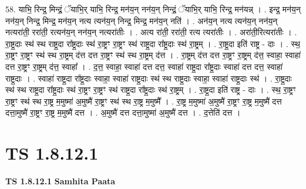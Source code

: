 \documentclass[17pt]{extarticle}
\begin{document}
58. याभि॒ रिन्द्र॒ मिन्द्रं॒ ॅयाभि॒र् याभि॒ रिन्द्र॒ मन॑य॒न् नन॑य॒न् निन्द्रं॒ ॅयाभि॒र् याभि॒ रिन्द्र॒ मन॑यन्न् । . इन्द्र॒ मन॑य॒न् नन॑य॒न् निन्द्र॒ मिन्द्र॒ मन॑य॒न् नत्य त्यन॑य॒न् निन्द्र॒ मिन्द्र॒ मन॑य॒न् नति॑ । . अन॑य॒न् नत्य त्यन॑य॒न् नन॑य॒न् नत्यरा॑ती॒ ररा॑ती॒ रत्यन॑य॒न् नन॑य॒न् नत्यरा॑तीः । . अत्य रा॑ती॒ ररा॑ती॒ रत्य त्यरा॑तीः । . अरा॑ती॒रित्यरा॑तीः । . रा॒ष्ट्र॒दाः स्थ॑ स्थ राष्ट्र॒दा रा᳚ष्ट्र॒दाः स्थ॑ रा॒ष्ट्रꣳ रा॒ष्ट्रꣳ स्थ॑ राष्ट्र॒दा रा᳚ष्ट्र॒दाः स्थ॑ रा॒ष्ट्रम् । . रा॒ष्ट्र॒दा इति॑ राष्ट्र - दाः । . स्थ॒ रा॒ष्ट्रꣳ रा॒ष्ट्रꣳ स्थ॑ स्थ रा॒ष्ट्रम् द॑त्त दत्त रा॒ष्ट्रꣳ स्थ॑ स्थ रा॒ष्ट्रम् द॑त्त । . रा॒ष्ट्रम् द॑त्त दत्त रा॒ष्ट्रꣳ रा॒ष्ट्रम् द॑त्त॒ स्वाहा॒ स्वाहा॑ दत्त रा॒ष्ट्रꣳ रा॒ष्ट्रम् द॑त्त॒ स्वाहा᳚ । . द॒त्त॒ स्वाहा॒ स्वाहा॑ दत्त दत्त॒ स्वाहा॑ राष्ट्र॒दा रा᳚ष्ट्र॒दाः स्वाहा॑ दत्त दत्त॒ स्वाहा॑ राष्ट्र॒दाः । . स्वाहा॑ राष्ट्र॒दा रा᳚ष्ट्र॒दाः स्वाहा॒ स्वाहा॑ राष्ट्र॒दाः स्थ॑ स्थ राष्ट्र॒दाः स्वाहा॒ स्वाहा॑ राष्ट्र॒दाः स्थ॑ । . रा॒ष्ट्र॒दाः स्थ॑ स्थ राष्ट्र॒दा रा᳚ष्ट्र॒दाः स्थ॑ रा॒ष्ट्रꣳ रा॒ष्ट्रꣳ स्थ॑ राष्ट्र॒दा रा᳚ष्ट्र॒दाः स्थ॑ रा॒ष्ट्रम् । . रा॒ष्ट्र॒दा इति॑ राष्ट्र - दाः । . स्थ॒ रा॒ष्ट्रꣳ रा॒ष्ट्रꣳ स्थ॑ स्थ रा॒ष्ट्र म॒मुष्मा॑ अ॒मुष्मै॑ रा॒ष्ट्रꣳ स्थ॑ स्थ रा॒ष्ट्र म॒मुष्मै᳚ । . रा॒ष्ट्र म॒मुष्मा॑ अ॒मुष्मै॑ रा॒ष्ट्रꣳ रा॒ष्ट्र म॒मुष्मै॑ दत्त दत्ता॒मुष्मै॑ रा॒ष्ट्रꣳ रा॒ष्ट्र म॒मुष्मै॑ दत्त । . अ॒मुष्मै॑ दत्त दत्ता॒मुष्मा॑ अ॒मुष्मै॑ दत्त । . द॒त्तेति॑ दत्त । \newline
\pagebreak
{}

\section{ TS 1.8.12.1 }

\textbf{TS 1.8.12.1 } \newline
\textbf{Samhita Paata} \newline
\end{document}
